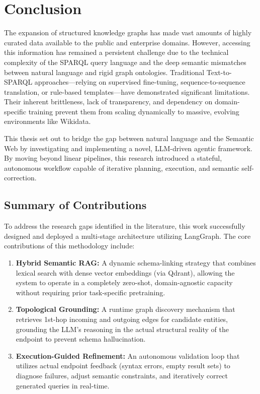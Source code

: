\newpage

\section{Conclusion}
\label{ch:conclusion}

The expansion of structured knowledge graphs has made vast amounts of highly curated data available to the public and enterprise domains. However, accessing this information has remained a persistent challenge due to the technical complexity of the SPARQL query language and the deep semantic mismatches between natural language and rigid graph ontologies. Traditional Text-to-SPARQL approaches—relying on supervised fine-tuning, sequence-to-sequence translation, or rule-based templates—have demonstrated significant limitations. Their inherent brittleness, lack of transparency, and dependency on domain-specific training prevent them from scaling dynamically to massive, evolving environments like Wikidata.

This thesis set out to bridge the gap between natural language and the Semantic Web by investigating and implementing a novel, LLM-driven agentic framework. By moving beyond linear pipelines, this research introduced a stateful, autonomous workflow capable of iterative planning, execution, and semantic self-correction.

\subsection{Summary of Contributions}
To address the research gaps identified in the literature, this work successfully designed and deployed a multi-stage architecture utilizing LangGraph. The core contributions of this methodology include:
\begin{enumerate}
    \item \textbf{Hybrid Semantic RAG:} A dynamic schema-linking strategy that combines lexical search with dense vector embeddings (via Qdrant), allowing the system to operate in a completely zero-shot, domain-agnostic capacity without requiring prior task-specific pretraining.
    \item \textbf{Topological Grounding:} A runtime graph discovery mechanism that retrieves 1st-hop incoming and outgoing edges for candidate entities, grounding the LLM's reasoning in the actual structural reality of the endpoint to prevent schema hallucination.
    \item \textbf{Execution-Guided Refinement:} An autonomous validation loop that utilizes actual endpoint feedback (syntax errors, empty result sets) to diagnose failures, adjust semantic constraints, and iteratively correct generated queries in real-time.
\end{enumerate}

